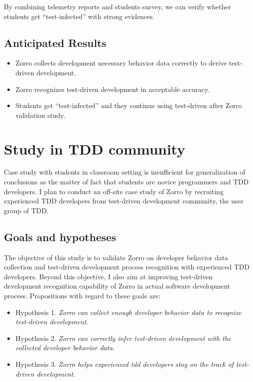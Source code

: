 By combining telemetry reports and students survey, we can verify whether
students get ``test-infected'' with strong evidences.

\subsection{Anticipated Results}
\begin{itemize}
\item Zorro collects development necessary behavior data correctly to
  derive test-driven development.
\item Zorro recognizes test-driven development in acceptable accuracy.
\item Students get ``test-infected'' and they continue using test-driven
  after Zorro validation study.
\end{itemize}

\section{Study in TDD community}
\label{sec:community}
Case study with students in classroom setting is insufficient for
generalization of conclusions as the matter of fact that students are
novice programmers and TDD developers. I plan to conduct an off-site case
study of Zorro by recruiting experienced TDD developers from test-driven
development community, the user group of TDD.

\subsection{Goals and hypotheses}
The objective of this study is to validate Zorro on developer behavior data
collection and test-driven development process recognition with experienced
TDD developers. Beyond this objective, I also aim at improving test-driven
development recognition capability of Zorro in actual software development
process. Propositions with regard to these goals are:
\begin{itemize}
\item{Hypothesis 1. }\textit{Zorro can collect enough developer behavior
    data to recognize test-driven development.}
\item{Hypothesis 2. }\textit{Zorro can correctly infer test-driven
    development with the collected developer behavior data.}
\item{Hypothesis 3. }\textit{Zorro helps experienced tdd developers stay on
    the track of test-driven development.}
\end{itemize}

